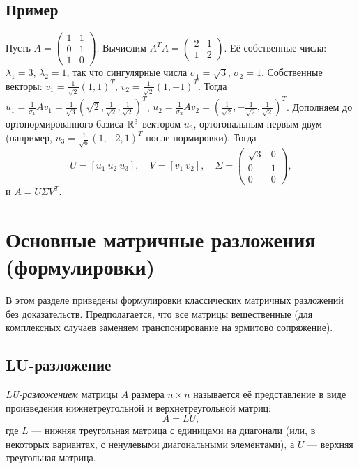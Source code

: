 \documentclass[10pt]{article}
\begin{document}
\subsection{Пример}

Пусть $A = \begin{pmatrix}1 & 1\\ 0 & 1\\ 1 & 0\end{pmatrix}$. Вычислим $A^TA = \begin{pmatrix}2 & 1\\ 1 & 2\end{pmatrix}$. Её собственные числа: $\lambda_1=3$, $\lambda_2=1$, так что сингулярные числа $\sigma_1=\sqrt{3}$, $\sigma_2=1$. Собственные векторы: $v_1=\frac{1}{\sqrt{2}}(1,1)^T$, $v_2=\frac{1}{\sqrt{2}}(1,-1)^T$. Тогда $u_1 = \frac{1}{\sigma_1}A v_1 = \frac{1}{\sqrt{3}}(\sqrt{2}, \frac{1}{\sqrt{2}}, \frac{1}{\sqrt{2}})^T$, $u_2 = \frac{1}{\sigma_2}A v_2 = (\frac{1}{\sqrt{2}}, -\frac{1}{\sqrt{2}}, \frac{1}{\sqrt{2}})^T$. Дополняем до ортонормированного базиса $\mathbb{R}^3$ вектором $u_3$, ортогональным первым двум (например, $u_3 = \frac{1}{\sqrt{6}}(1, -2, 1)^T$ после нормировки). Тогда
\[
U = [u_1\ u_2\ u_3],\quad V = [v_1\ v_2],\quad \Sigma = \begin{pmatrix}\sqrt{3} & 0\\ 0 & 1\\ 0 & 0\end{pmatrix},
\]
и $A = U\Sigma V^T$.

\section{Основные матричные разложения (формулировки)}

В этом разделе приведены формулировки классических матричных разложений без доказательств. Предполагается, что все матрицы вещественные (для комплексных случаев заменяем транспонирование на эрмитово сопряжение).

\subsection{LU-разложение}
\begin{definition}
    \textit{LU-разложением} матрицы $A$ размера $n\times n$ называется её представление в виде произведения нижнетреугольной и верхнетреугольной матриц:
    \[
    A = LU,
    \]
    где $L$ — нижняя треугольная матрица с единицами на диагонали (или, в некоторых вариантах, с ненулевыми диагональными элементами), а $U$ — верхняя треугольная матрица.
\end{definition}
\end{document}
